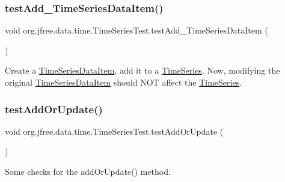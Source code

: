 \subsubsection{\texorpdfstring{test\+Add\+\_\+\+Time\+Series\+Data\+Item()}{testAdd\_TimeSeriesDataItem()}}
{\footnotesize\ttfamily void org.\+jfree.\+data.\+time.\+Time\+Series\+Test.\+test\+Add\+\_\+\+Time\+Series\+Data\+Item (\begin{DoxyParamCaption}{ }\end{DoxyParamCaption})}

Create a \mbox{\hyperlink{classorg_1_1jfree_1_1data_1_1time_1_1_time_series_data_item}{Time\+Series\+Data\+Item}}, add it to a \mbox{\hyperlink{classorg_1_1jfree_1_1data_1_1time_1_1_time_series}{Time\+Series}}. Now, modifying the original \mbox{\hyperlink{classorg_1_1jfree_1_1data_1_1time_1_1_time_series_data_item}{Time\+Series\+Data\+Item}} should N\+OT affect the \mbox{\hyperlink{classorg_1_1jfree_1_1data_1_1time_1_1_time_series}{Time\+Series}}. \mbox{\label{classorg_1_1jfree_1_1data_1_1time_1_1_time_series_test_ac4f9d9859cf29c2276df2a2e61eea7ff}} 
\subsubsection{\texorpdfstring{test\+Add\+Or\+Update()}{testAddOrUpdate()}}
{\footnotesize\ttfamily void org.\+jfree.\+data.\+time.\+Time\+Series\+Test.\+test\+Add\+Or\+Update (\begin{DoxyParamCaption}{ }\end{DoxyParamCaption})}

Some checks for the add\+Or\+Update() method. \mbox{\label{classorg_1_1jfree_1_1data_1_1time_1_1_time_series_test_a43ec8e21a8c01c4c0cfea8a8bbe55a06}} 
